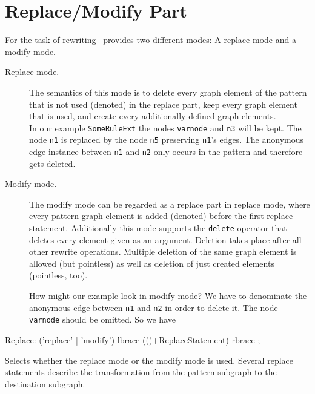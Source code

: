 \section{Replace/Modify Part}
\label{replacepart}
For the task of rewriting \GrG\ provides two different modes: A replace mode and a modify mode.
\begin{description}
  \item[Replace mode.] The semantics of this mode is to delete every graph element of the pattern that is not used (denoted) in the replace part, keep every graph element that is used, and create every additionally defined graph elements.\\
  In our example \texttt{SomeRuleExt} the nodes \texttt{varnode} and \texttt{n3} will be kept. The node \texttt{n1} is replaced by the node \texttt{n5} preserving \texttt{n1}'s edges. The anonymous edge instance between \texttt{n1} and \texttt{n2} only occurs in the pattern and therefore gets deleted.
  \item[Modify mode.] The modify mode can be regarded as a replace part in replace mode, where every pattern graph element is added (denoted) before the first replace statement. Additionally this mode supports the \texttt{delete} operator that deletes every element given as an argument. Deletion takes place after all other rewrite operations. Multiple deletion of the same graph element is allowed (but pointless) as well as deletion of just created elements (pointless, too).
\begin{example}
How might our example look in modify mode? We have to denominate the anonymous edge between \texttt{n1} and \texttt{n2} in order to delete it. The node \texttt{varnode} should be omitted. So we have
\begin{grgen}
rule SomeRuleExtMod(varnode: Node): (Node, EdgeTypeB) {
  pattern {
    ...
    n1 -e0:Edge-> n2;
    ...
  }
  modify {
    n5 : NodeTypeC<n1>;
    n3 -e1:EdgeTypeB-> n5;
    delete(e0);
    eval {
      ...
\end{grgen}
\end{example}
\end{description}

\begin{rail}
  Replace: ('replace' | 'modify') lbrace (()+ReplaceStatement) rbrace ;
\end{rail}
Selects whether the replace mode or the modify mode is used. Several replace statements describe the transformation from the pattern subgraph to the destination subgraph.

